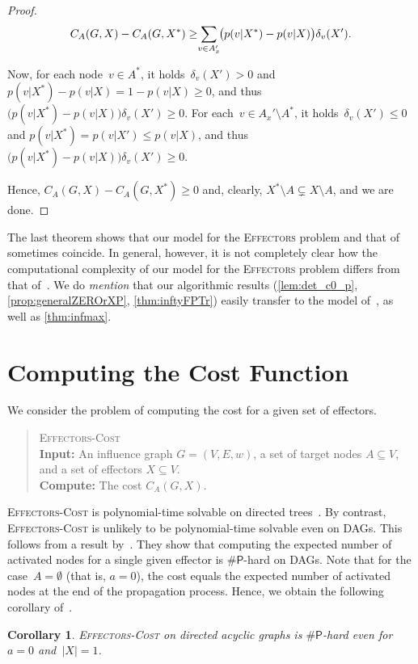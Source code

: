 \documentclass{article}
\newcommand{\p}{{\mathsf{P}}}
\newtheorem{corollary}{Corollary}
\newcommand{\probSharpDef}[3]{
  \begin{quote}
    #1 \\
    \textbf{Input:} #2 \\
    \textbf{Compute:} #3
  \end{quote}
}
\newcommand{\probEffectors}{\textsc{Effectors}\xspace}
\newcommand{\probCost}{\textsc{Effectors-Cost}\xspace}
\begin{document}
\begin{proof}
  \[
    C_A(G,X)-C_A(G,X^*) \ge \smashoperator{\sum_{v\in A_x'}}\big(p(v|X^*)-p(v|X)\big)\delta_v(X').
  \]

  Now, for each node~$v\in A^*$, it holds~$\delta_v(X')>0$ and
  $p(v|X^*)-p(v|X) = 1 - p(v|X) \ge 0$, and thus
  $\big(p(v|X^*)-p(v|X)\big)\delta_v(X')\geq 0.$
  For each~$v\in A_x'\setminus A^*$, it holds~$\delta_v(X')\le 0$ and
  $p(v|X^*)=p(v|X')\le p(v|X)$,
  and thus $\big(p(v|X^*)-p(v|X)\big)\delta_v(X')\geq 0.$
  
  Hence, $C_A(G,X)-C_A(G,X^*) \geq 0$ and, clearly, $X^*\setminus A
  \subsetneq X\setminus A$, and we are done.   
\end{proof}


The last theorem shows that our model for the \probEffectors problem and that of~\citet{LTGMH10} sometimes coincide.
In general,
however,
it is not completely clear how the computational complexity of our model for the \probEffectors problem
differs from that of~\citet{LTGMH10}.
We do \emph{mention} that our algorithmic results
(\autoref{lem:det_c0_p},
\autoref{prop:generalZEROrXP},
\autoref{thm:inftyFPTr})
easily transfer to the model of~\citet{LTGMH10},
as well as \autoref{thm:infmax}.


\section{Computing the Cost Function}\label{section:computingCost}
We consider the problem of computing the cost for a given set of effectors.
\probSharpDef
  {\probCost}
  {An influence graph $G = (V, E, w)$, a set of target nodes
    $A\subseteq V$, and a set of effectors $X \subseteq V$.}
  {The cost $C_A(G, X)$.}

\probCost is polynomial-time solvable on directed trees~\cite{LTGMH10}.
By contrast, 
\probCost is unlikely to be polynomial-time solvable even on DAGs.
This follows from a result by~\citet[Theorem 1]{wang2012scalable}.
They show that computing the expected number of activated nodes for a
single given effector is $\#\p$-hard on DAGs.
Note that for the case~$A=\emptyset$ (that is, $a=0$), the cost equals the expected
number of activated nodes at the end of the propagation process.
Hence, we obtain the following corollary of~\citet{wang2012scalable}.

\begin{corollary}\label{thm:costNP}
  \probCost on directed acyclic graphs is $\#\p$-hard even for~$a=0$ and~$|X|=1$.
\end{corollary}
\end{document}
